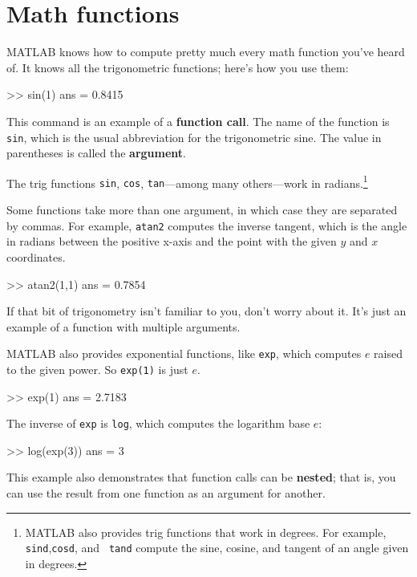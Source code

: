 \documentclass[
]{book}
\numberwithin{Answer}{chapter}
\numberwithin{Exercise}{chapter}
\begin{document}
\section{Math functions}

MATLAB knows how to compute pretty much every math function you've
heard of.  It knows all the trigonometric functions; here's how you
use them:


\begin{code}
>> sin(1)
ans = 0.8415
\end{code}

This command is an example of a {\bf function call}.  The name of the
function is {\tt sin}, which is the usual abbreviation for the
trigonometric sine.  The value in parentheses is called the {\bf argument}.

The trig functions {\tt sin}, {\tt cos}, {\tt tan}---among many
others---work in radians.\footnote{MATLAB also provides trig functions
that work in degrees. For example, {\tt sind},{\tt cosd}, and {\tt
tand} compute the sine, cosine, and tangent of an angle given in
degrees.}

Some functions take more than one argument, in which case they are
separated by commas.  For example, {\tt atan2} computes the inverse
tangent, which is the angle in radians between the positive x-axis and
the point with the given $y$ and $x$ coordinates.

\begin{code}
>> atan2(1,1)
ans = 0.7854
\end{code}

If that bit of trigonometry isn't familiar to you, don't worry about
it.  It's just an example of a function with multiple arguments.

MATLAB also provides exponential functions, like {\tt exp}, which computes $e$ raised to the given power.  So {\tt exp(1)} is just $e$.

\begin{code}
>> exp(1)
ans = 2.7183
\end{code}

The inverse of {\tt exp} is {\tt log}, which computes the logarithm base $e$:

\begin{code}
>> log(exp(3))
ans = 3
\end{code}

This example also demonstrates that function calls can be {\bf nested};
that is, you can use the result from one function as an argument for
another.
\end{document}
